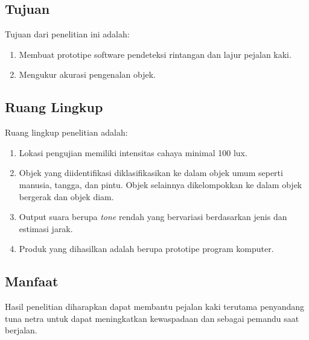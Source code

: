 \subsection*{Tujuan}

Tujuan dari penelitian ini adalah:
\begin{enumerate}[noitemsep] 
\item Membuat prototipe software pendeteksi rintangan dan lajur pejalan kaki.
\item Mengukur akurasi pengenalan objek.
\end{enumerate}

\subsection*{Ruang Lingkup}

Ruang lingkup penelitian adalah:
\begin{enumerate}[noitemsep] 
\item Lokasi pengujian memiliki intensitas cahaya minimal 100 lux.
\item Objek yang diidentifikasi diklasifikasikan ke dalam objek umum seperti manusia, tangga, dan pintu. Objek selainnya dikelompokkan ke dalam objek bergerak dan objek diam.
\item Output suara berupa \textit{tone} rendah yang bervariasi berdasarkan jenis dan estimasi jarak.
\item Produk yang dihasilkan adalah berupa prototipe program komputer.
\end{enumerate}

\subsection*{Manfaat}

Hasil penelitian diharapkan dapat membantu pejalan kaki terutama penyandang tuna netra untuk dapat meningkatkan kewaspadaan dan sebagai pemandu saat berjalan.
